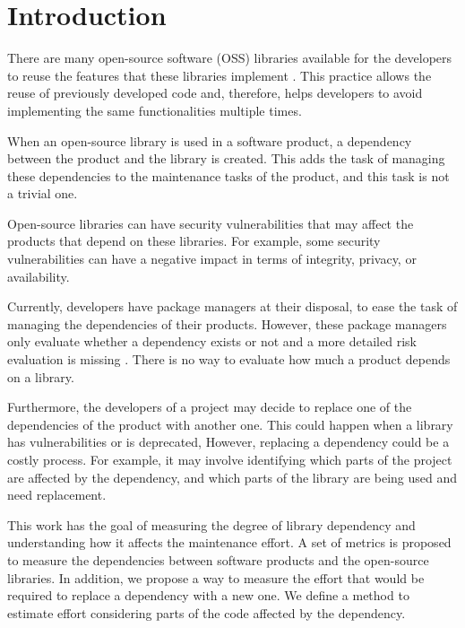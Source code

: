 \documentclass[a4paper]{article}
\begin{document}
\section{Introduction}

There are many open-source software (OSS) libraries available for the developers to reuse the features that these libraries implement \cite{kikas2017structure}. This practice allows the reuse of previously developed code and, therefore, helps developers to avoid implementing the same functionalities multiple times.

When an open-source library is used in a software product, a dependency between the product and the library is created. This adds the task of managing these dependencies to the maintenance tasks of the product, and this task is not a trivial one.

Open-source libraries can have security vulnerabilities that may affect the products that depend on these libraries. For example, some security vulnerabilities can have a negative impact in terms of integrity, privacy, or availability.

Currently, developers have package managers at their disposal, to ease the task of managing the dependencies of their products. However, these package managers only evaluate whether a dependency exists or not and a more detailed risk evaluation is missing \cite{hejderup2018prazi}. There is no way to evaluate how much a product depends on a library.

Furthermore, the developers of a project may decide to replace one of the dependencies of the product with another one. This could happen when a library has vulnerabilities or is deprecated,
However, replacing a dependency could be a costly process. For example, it may involve identifying which parts of the project are affected by the dependency, and which parts of the library are being used and need replacement.

This work has the goal of measuring the degree of library dependency and understanding how it affects the maintenance effort. A set of metrics is proposed to measure the dependencies between software products and the open-source libraries. In addition, we propose a way to measure the effort that would be required to replace a dependency with a new one. We define a method to estimate effort considering parts of the code affected by the dependency.
\end{document}
